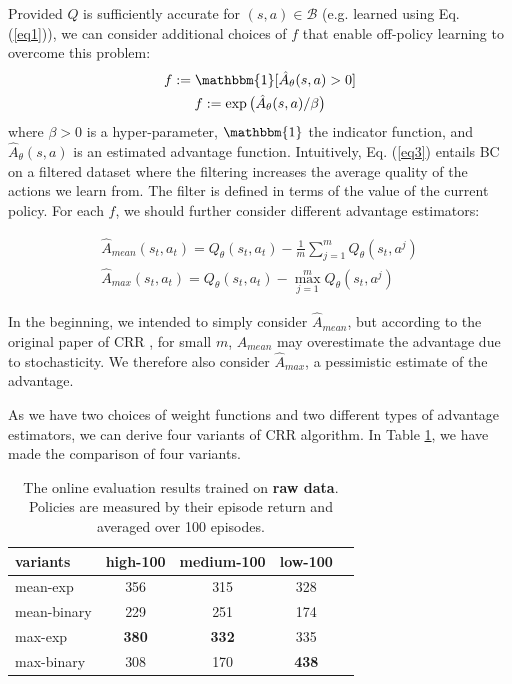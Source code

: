 \documentclass[nohyperref]{article}
\theoremstyle{plain}
\theoremstyle{definition}
\theoremstyle{remark}
\begin{document}
Provided $Q$ is sufficiently accurate for $(s, a)\in\mathcal{B}$ (e.g. learned using Eq. (\ref{eq1})), we can consider additional choices of $f$ that enable off-policy learning to overcome this problem:
\begin{gather}
    f:=\mathbbm{1}[\hat{A}_\theta(s, a)>0]\label{eq3}\\f:=\exp\big(\hat{A}_\theta(s, a)/\beta\big)\label{eq4}
\end{gather}
where $\beta>0$ is a hyper-parameter, $\mathbbm{1}$ the indicator function, and $\hat{A}_\theta(s, a)$ is an estimated advantage function. Intuitively, Eq. (\ref{eq3}) entails BC on a filtered dataset where the filtering increases the average quality of the actions we learn from. The filter is defined in terms of the value of the current policy. For each $f$, we should further consider different advantage estimators:

\begin{gather}
    \hat{A}_{mean}(s_t, a_t)=Q_\theta(s_t, a_t)-\frac{1}{m}\sum_{j=1}^mQ_\theta(s_t, a^j)\label{eq5}\\\hat{A}_{max}(s_t, a_t)=Q_\theta(s_t, a_t)-\max_{j=1}^mQ_\theta(s_t, a^j)\label{eq6}
\end{gather}

In the beginning, we intended to simply consider $\hat{A}_{mean}$, but according to the original paper of CRR \cite{2006.15134}, for small $m$, $\hat{A}_{mean}$ may overestimate the advantage due to stochasticity. We therefore also consider $\hat{A}_{max}$, a pessimistic estimate of the advantage. 

As we have two choices of weight functions and two different types of advantage estimators, we can derive four variants of CRR algorithm. In Table \ref{raw table}, we have made the comparison of four variants.


\begin{table}[H]
\caption{The online evaluation results trained on \textbf{raw data}. Policies are measured by their episode return and averaged over 100 episodes.}
\label{raw table}
\vskip 0.15in
\begin{center}
\begin{small}
\begin{sc}
\begin{tabular}{lcccr}
\toprule
variants & high-100 & medium-100 & low-100 \\
\midrule
mean-exp & 356 & 315 & 328\\
mean-binary & 229 & 251 & 174\\
max-exp & \textbf{380} & \textbf{332} & 335\\
max-binary & 308 & 170 & \textbf{438}\\
\bottomrule
\end{tabular}
\end{sc}
\end{small}
\end{center}
\vskip -0.1in
\end{table}
\end{document}
